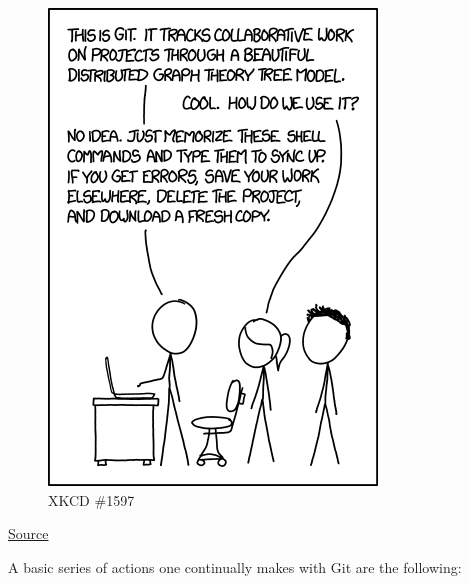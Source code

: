 \documentclass[
  letterpaper,
  DIV=11,
  numbers=noendperiod]{scrreport}
\begin{document}
\begin{figure}

{\centering \includegraphics{modules/../media/xkcd-git.png}

}

\caption{XKCD \#1597}

\end{figure}

\href{https://xkcd.com/1597}{Source}

A basic series of actions one continually makes with Git are the
following:
\end{document}
